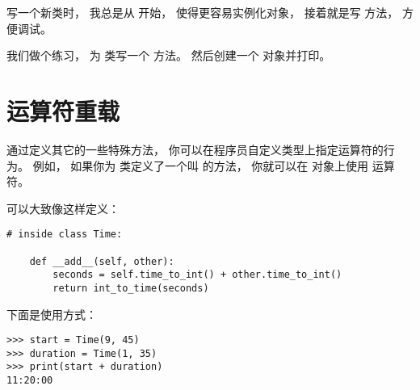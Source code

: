 写一个新类时， 我总是从  开始， 使得更容易实例化对象，
接着就是写  方法， 方便调试。


我们做个练习， 为  类写一个  方法。
然后创建一个  对象并打印。

\section{运算符重载}
\label{operator.overloading}


通过定义其它的一些特殊方法， 你可以在程序员自定义类型上指定运算符的行为。
例如， 如果你为  类定义了一个叫  的方法，
你就可以在  对象上使用 \li{+} 运算符。

  


可以大致像这样定义：

  

\begin{lstlisting}
# inside class Time:

    def __add__(self, other):
        seconds = self.time_to_int() + other.time_to_int()
        return int_to_time(seconds)
\end{lstlisting}

%

下面是使用方式：

\begin{lstlisting}
>>> start = Time(9, 45)
>>> duration = Time(1, 35)
>>> print(start + duration)
11:20:00
\end{lstlisting}

%

